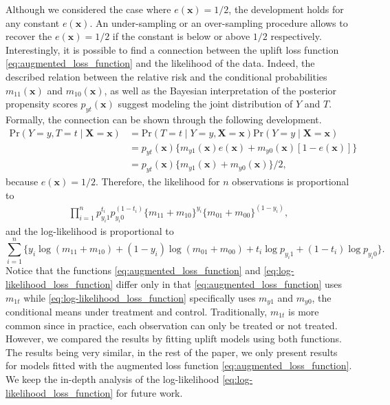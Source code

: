 \documentclass{article}
\def\X{\mathbf X}
\def\x{\mathbf x}
\def \P {\mathrm{Pr}}
\begin{document}
Although we considered the case where $e(\x)=1/2$, the development holds for any constant $e(\x)$. An under-sampling or an over-sampling procedure allows to recover the $e(\x) = 1/2$ if the constant is below or above $1/2$ respectively. Interestingly, it is possible to find a connection between the uplift loss function \eqref{eq:augmented_loss_function} and the likelihood of the data. Indeed, the described relation between the relative risk and the conditional probabilities $m_{11}(\x)$ and $m_{10}(\x)$, as well as the Bayesian interpretation of the posterior propensity scores $p_{yt}(\x)$ suggest modeling the joint distribution of $Y$ and $T$. Formally, the connection can be shown through the following development.
\begin{align*}
    \P(Y=y, T=t \mid \X=\x)  &= \P(T=t \mid Y=y, \X=\x) \P(Y=y\mid \X=\x) \\
    & = p_{yt}(\x) \{ m_{y1}(\x) e(\x) + m_{y0}(\x) [1-e(\x)]\} \\
    & = p_{yt}(\x) \{ m_{y1}(\x) + m_{y0}(\x)\} / 2,
\end{align*}
because $e(\x)=1/2$. Therefore, the likelihood for $n$ observations is proportional to
\begin{align*}
    \prod_{i=1}^n p_{y_i 1}^{t_i} p_{y_i 0}^{(1-t_i)} \{m_{11} + m_{10}\}^{y_i}  \{m_{01} + m_{00}\}^{(1-y_i)},
\end{align*}
and the log-likelihood is proportional to
\begin{equation}
   \sum_{i=1}^n \{y_i \log(m_{11}+m_{10}) + (1 - y_i)\log(m_{01} + m_{00}) + t_i \log p_{y_i 1} + (1 - t_i)\log p_{y_i 0} \}.
    \label{eq:log-likelihood_loss_function}
\end{equation}
Notice that the functions \eqref{eq:augmented_loss_function} and \eqref{eq:log-likelihood_loss_function} differ only in that \eqref{eq:augmented_loss_function} uses $m_{1t}$ while \eqref{eq:log-likelihood_loss_function} specifically uses $m_{y1}$ and $m_{y0}$, the conditional means under treatment and control. Traditionally, $m_{1t}$ is more common since in practice, each observation can only be treated or not treated. However, we compared the results by fitting uplift models using both functions. The results being very similar, in the rest of the paper, we only present results for models fitted with the augmented loss function \eqref{eq:augmented_loss_function}. We keep the in-depth analysis of the log-likelihood \eqref{eq:log-likelihood_loss_function} for future work.
\end{document}
